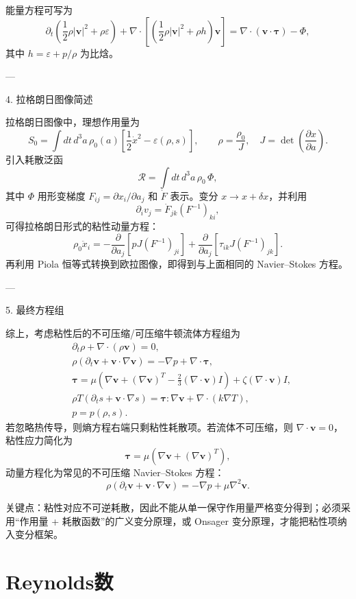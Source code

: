 \documentclass[b5paper]{book}
\begin{document}
能量方程可写为
\[
\partial_t\left(\frac12\rho|\mathbf v|^2+\rho\varepsilon\right)
+\nabla\cdot\left[\left(\frac12\rho|\mathbf v|^2+\rho h\right)\mathbf v\right]
=
\nabla\cdot(\mathbf v\cdot\boldsymbol\tau)-\Phi,
\]
其中 \(h=\varepsilon+p/\rho\) 为比焓。

---

 4. 拉格朗日图像简述

拉格朗日图像中，理想作用量为
\[
S_0=\int dt\,d^3a\,
\rho_0(a)\left[\frac12\dot x^2-\varepsilon(\rho,s)\right],
\qquad
\rho=\frac{\rho_0}{J},\quad J=\det\left(\frac{\partial x}{\partial a}\right).
\]
引入耗散泛函
\[
\mathcal R=\int dt\,d^3a\,\rho_0\,\Phi,
\]
其中 \(\Phi\) 用形变梯度 \(F_{ij}=\partial x_i/\partial a_j\) 和 \(\dot F\) 表示。变分 \(x\to x+\delta x\)，并利用
\[
\partial_i v_j=\dot F_{jk}(F^{-1})_{ki},
\]
可得拉格朗日形式的粘性动量方程：
\[
\rho_0\ddot x_i
=
-\frac{\partial}{\partial a_j}\left[pJ(F^{-1})_{ji}\right]
+\frac{\partial}{\partial a_j}\left[\tau_{ik}J(F^{-1})_{jk}\right].
\]
再利用 Piola 恒等式转换到欧拉图像，即得到与上面相同的 Navier–Stokes 方程。

---

 5. 最终方程组

综上，考虑粘性后的不可压缩/可压缩牛顿流体方程组为
\[
\boxed{
\begin{aligned}
&\partial_t\rho+\nabla\cdot(\rho\mathbf v)=0,\\[1mm]
&\rho\left(\partial_t\mathbf v+\mathbf v\cdot\nabla\mathbf v\right)
=-\nabla p+\nabla\cdot\boldsymbol\tau,\\[1mm]
&\boldsymbol\tau
=
\mu\left(\nabla\mathbf v+(\nabla\mathbf v)^T-\frac23(\nabla\cdot\mathbf v)I\right)
+\zeta(\nabla\cdot\mathbf v)I,\\[1mm]
&\rho T\left(\partial_t s+\mathbf v\cdot\nabla s\right)
=
\boldsymbol\tau:\nabla\mathbf v+\nabla\cdot(k\nabla T),\\[1mm]
&p=p(\rho,s).
\end{aligned}}
\]
若忽略热传导，则熵方程右端只剩粘性耗散项。若流体不可压缩，则 \(\nabla\cdot\mathbf v=0\)，粘性应力简化为
\[
\boldsymbol\tau=\mu\left(\nabla\mathbf v+(\nabla\mathbf v)^T\right),
\]
动量方程化为常见的不可压缩 Navier–Stokes 方程：
\[
\rho\left(\partial_t\mathbf v+\mathbf v\cdot\nabla\mathbf v\right)
=-\nabla p+\mu\nabla^2\mathbf v.
\]

关键点：粘性对应不可逆耗散，因此不能从单一保守作用量严格变分得到；必须采用“作用量 + 耗散函数”的广义变分原理，或 Onsager 变分原理，才能把粘性项纳入变分框架。
\section{Reynolds数}
\end{document}
